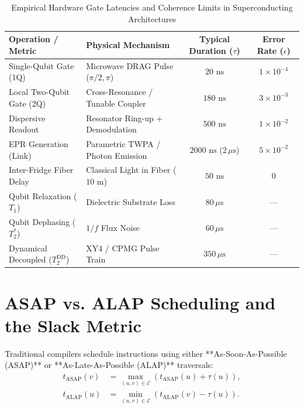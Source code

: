 \begin{table}[htbp]
    \centering
    \small
    \caption{Empirical Hardware Gate Latencies and Coherence Limits in Superconducting Architectures}
    \label{tab:hardware_latencies}
    \begin{tabularx}{\textwidth}{llcc}
        \toprule
        \textbf{Operation / Metric} & \textbf{Physical Mechanism} & \textbf{Typical Duration ($\tau$)} & \textbf{Error Rate ($\epsilon$)} \\
        \midrule
        Single-Qubit Gate (1Q) & Microwave DRAG Pulse ($\pi/2, \pi$) & $20\text{ ns}$ & $1 \times 10^{-4}$ \\
        Local Two-Qubit Gate (2Q) & Cross-Resonance / Tunable Coupler & $180\text{ ns}$ & $3 \times 10^{-3}$ \\
        Dispersive Readout & Resonator Ring-up + Demodulation & $500\text{ ns}$ & $1 \times 10^{-2}$ \\
        EPR Generation (Link) & Parametric TWPA / Photon Emission & $2000\text{ ns}$ ($2\,\mu\text{s}$) & $5 \times 10^{-2}$ \\
        Inter-Fridge Fiber Delay & Classical Light in Fiber ($10\text{ m}$) & $50\text{ ns}$ & $0$ \\
        Qubit Relaxation ($T_1$) & Dielectric Substrate Loss & $80\,\mu\text{s}$ & --- \\
        Qubit Dephasing ($T_2^*$) & $1/f$ Flux Noise & $60\,\mu\text{s}$ & --- \\
        Dynamical Decoupled ($T_2^{\text{DD}}$) & XY4 / CPMG Pulse Train & $350\,\mu\text{s}$ & --- \\
        \bottomrule
    \end{tabularx}
\end{table}

\section{ASAP vs. ALAP Scheduling and the Slack Metric}
\label{sec:asap_alap}

Traditional compilers schedule instructions using either **As-Soon-As-Possible (ASAP)** or **As-Late-As-Possible (ALAP)** traversals:
\begin{align}
    t_{\text{ASAP}}(v) &= \max_{(u, v) \in \mathcal{E}} \left( t_{\text{ASAP}}(u) + \tau(u) \right), \\
    t_{\text{ALAP}}(u) &= \min_{(u, v) \in \mathcal{E}} \left( t_{\text{ALAP}}(v) - \tau(u) \right).
\end{align}

